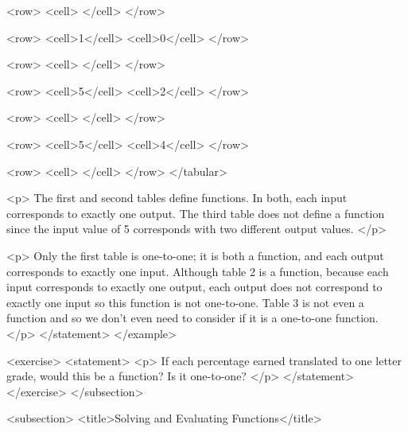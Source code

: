                    <row>
                        <cell> </cell>
                    </row>

                    <row>
                        <cell>1</cell>
                        <cell>0</cell>
                    </row>

                    <row>
                        <cell> </cell>
                    </row>

                    <row>
                        <cell>5</cell>
                        <cell>2</cell>
                    </row>

                    <row>
                        <cell> </cell>
                    </row>

                    <row>
                        <cell>5</cell>
                        <cell>4</cell>
                    </row>

                    <row>
                        <cell> </cell>
                    </row>
                </tabular>

                <p>
                    The first and second tables define functions.
                    In both, each input corresponds to exactly one output.
                    The third table does not define a function since the input value of 5 corresponds with two different output values.
                </p>

                <p>
                    Only the first table is one-to-one; it is both a function, and each output corresponds to exactly one input.
                    Although table 2 is a function, because each input corresponds to exactly one output, each output does not correspond to exactly one input so this function is not one-to-one.
                    Table 3 is not even a function and so we don’t even need to consider if it is a one-to-one function.
                </p>
            </statement>
        </example>

        <exercise>
            <statement>
                <p>
                    If each percentage earned translated to one letter grade, would this be a function? Is it one-to-one?
                </p>
            </statement>
        </exercise>
    </subsection>


    <subsection>
        <title>Solving and Evaluating Functions</title>

